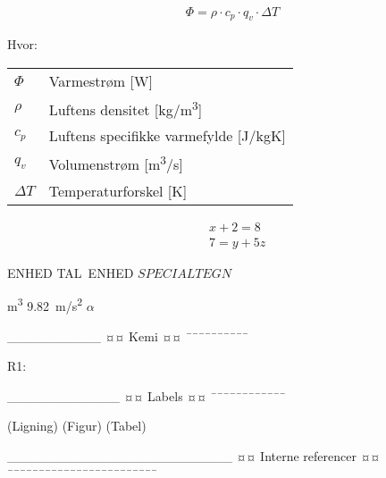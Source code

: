 \begin{align}
		
	\label{eq:LABEL} %
\end{align}

\begin{align}
	\Phi = \rho \cdot c_p \cdot q_v \cdot \Delta T
	\label{eq:varmeflux}
\end{align}

Hvor:
\begin{table}[H]
	\begin{tabular}{l|l}
	$\Phi$     & Varmestrøm [\si{W}] \\
	$\rho$ 	   & Luftens densitet [\si{kg/m^3}] \\
	$c_p$ 	   & Luftens specifikke varmefylde [\si{J/kgK}] \\
	$q_v$	   & Volumenstrøm [\si{m^3/s}] \\
	$\Delta T$ & Temperaturforskel [\si{K}]
	\end{tabular}
\end{table}

\begin{align}
& x + 2 = 8 	\label{eq:lign1} \\ 	%
& 7 = y + 5 z 	\label{eq:lign2}
\end{align}

\si{ENHED}
\SI{TAL}{ENHED}
$SPECIALTEGN$

\si{m^3}
\SI{9,82}{m/s^2}
$\alpha$

__________
¤¤ Kemi ¤¤
¯¯¯¯¯¯¯¯¯¯




R1: 

____________
¤¤ Labels ¤¤
¯¯¯¯¯¯¯¯¯¯¯¯

\label{eq:...} 		(Ligning)
\label{fig:...} 	(Figur)
\label{tab:...} 	(Tabel)


________________________
¤¤ Interne referencer ¤¤
¯¯¯¯¯¯¯¯¯¯¯¯¯¯¯¯¯¯¯¯¯¯¯¯

